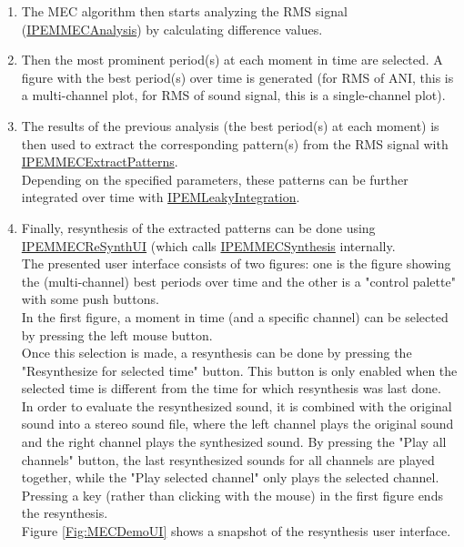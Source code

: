 \begin{enumerate}
\item
    The MEC algorithm then starts analyzing the RMS signal
    (\hyperlink{FuncRef:IPEMMECAnalysis}{IPEMMECAnalysis}) by calculating difference values.

\item
    Then the most prominent period(s) at each moment in time are selected.
    A figure with the best period(s) over time is generated (for RMS
    of ANI, this is a multi-channel plot, for RMS of sound
    signal, this is a single-channel plot).

\item
    The results of the previous analysis (the best period(s) at each
    moment) is then used to extract the corresponding pattern(s) from
    the RMS signal with
    \hyperlink{FuncRef:IPEMMECExtractPatterns}{IPEMMECExtractPatterns}.\\
    Depending on the specified parameters, these patterns can be
    further integrated over time with
    \hyperlink{FuncRef:IPEMLeakyIntegration}{IPEMLeakyIntegration}.

\item
    Finally, resynthesis of the extracted patterns can be done
    using \hyperlink{FuncRef:IPEMMECReSynthUI}{IPEMMECReSynthUI} (which
    calls
    \hyperlink{FuncRef:IPEMMECSynthesis}{IPEMMECSynthesis}
    internally.\\
    The presented user interface consists of two figures: one is
    the figure showing the (multi-channel) best periods over time
    and the other is a "control palette" with some push buttons.\\
    In the first figure, a moment in time (and a specific
    channel) can be selected by pressing the left mouse button.\\
    Once this selection is made, a resynthesis can be done by
    pressing the "Resynthesize for selected time" button. This
    button is only enabled when the selected time is different
    from the time for which resynthesis was last done.\\
    In order to evaluate the resynthesized sound, it is combined
    with the original sound into a stereo sound file, where the
    left channel plays the original sound and the right channel
    plays the synthesized sound. By pressing the "Play all
    channels" button, the last resynthesized sounds for all
    channels are played together, while the "Play selected
    channel" only plays the selected channel.\\
    Pressing a key (rather than clicking with the mouse) in the
    first figure ends the resynthesis.\\
    Figure \ref{Fig:MECDemoUI} shows a snapshot of the
    resynthesis user interface.

\end{enumerate}

